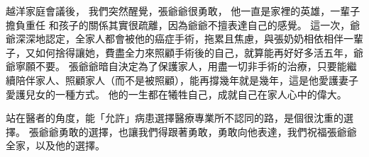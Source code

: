 \documentclass[12pt, a4paper]{article}
\begin{document}











越洋家庭會議後，
我們突然醒覺，張爺爺很勇敢，%
他一直是家裡的英雄，一輩子擔負重任
和孩子的關係其實很疏離，因為爺爺不擅表達自己的感覺。
這一次，爺爺深深地認定，全家人都會被他的癌症手術，拖累且焦慮，與張奶奶相依相伴一輩子，又如何捨得讓她，費盡全力來照顧手術後的自己，就算能再好好多活五年，爺爺寧願不要。
張爺爺暗自決定為了保護家人，用盡一切非手術的治療，只要能繼續陪伴家人、照顧家人（而不是被照顧），能再撐幾年就是幾年，這是他愛護妻子愛護兒女的一種方式。
他的一生都在犧牲自己，成就自己在家人心中的偉大。


站在醫者的角度，能「允許」病患選擇醫療專業所不認同的路，是個很沈重的選擇。
張爺爺勇敢的選擇，也讓我們得跟著勇敢，勇敢向他表達，我們祝福張爺爺全家，以及他的選擇。
\end{document}
